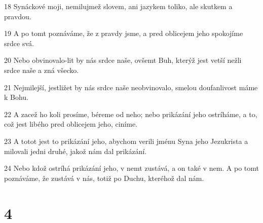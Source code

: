 \par 18 Synáckové moji, nemilujmež slovem, ani jazykem toliko, ale skutkem a pravdou.
\par 19 A po tomt poznáváme, že z pravdy jsme, a pred oblicejem jeho spokojíme srdce svá.
\par 20 Nebo obvinovalo-lit by nás srdce naše, ovšemt Buh, kterýž jest vetší nežli srdce naše a zná všecko.
\par 21 Nejmilejší, jestližet by nás srdce naše neobvinovalo, smelou doufanlivost máme k Bohu.
\par 22 A zacež ho koli prosíme, béreme od neho; nebo prikázání jeho ostríháme, a to, což jest libého pred oblicejem jeho, ciníme.
\par 23 A totot jest to prikázání jeho, abychom verili jménu Syna jeho Jezukrista a milovali jedni druhé, jakož nám dal prikázání.
\par 24 Nebo kdož ostríhá prikázání jeho, v nemt zustává, a on také v nem. A po tomt poznáváme, že zustává v nás, totiž po Duchu, kteréhož dal nám.

\chapter{4}

